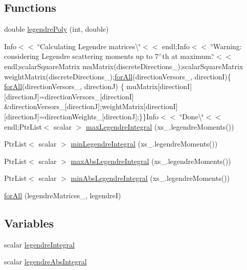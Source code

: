 \subsection*{Functions}
\begin{DoxyCompactItemize}
\item 
double \hyperlink{calcLegendreMatrices_8H_ad27427e4bcb16b18937b0bf2ca436296}{legendre\+Poly} (int, double)
\item 
Info$<$$<$ \char`\"{}Calculating Legendre matrices\textbackslash{}\char`\"{}$<$$<$ endl;Info$<$$<$ \char`\"{}Warning\+: considering Legendre scattering moments up to 7$^\wedge$th at maximum.\char`\"{}$<$$<$ endl;scalar\+Square\+Matrix mu\+Matrix(discrete\+Directions\+\_\+);scalar\+Square\+Matrix weight\+Matrix(discrete\+Directions\+\_\+);\hyperlink{correctBoundaryFlux__2p_8H_a72582193b0ba782b35945b2502401afd}{for\+All}(direction\+Versors\+\_\+, directionI)\{ \hyperlink{correctBoundaryFlux__2p_8H_a72582193b0ba782b35945b2502401afd}{for\+All}(direction\+Versors\+\_\+, directionJ) \{ mu\+Matrix\mbox{[}directionI\mbox{]}\mbox{[}directionJ\mbox{]}=direction\+Versors\+\_\+\mbox{[}directionI\mbox{]} \&direction\+Versors\+\_\+\mbox{[}directionJ\mbox{]};weight\+Matrix\mbox{[}directionI\mbox{]}\mbox{[}directionJ\mbox{]}=direction\+Weights\+\_\+\mbox{[}directionJ\mbox{]};\}\}Info$<$$<$ \char`\"{}Done\textbackslash{}\char`\"{}$<$$<$ endl;Ptr\+List$<$ scalar $>$ \hyperlink{calcLegendreMatrices_8H_aca7173d47ee3def5f50a4e2693fc5b31}{max\+Legendre\+Integral} (xs\+\_\+.\+legendre\+Moments())
\item 
Ptr\+List$<$ scalar $>$ \hyperlink{calcLegendreMatrices_8H_a379818ae2c8b40656a8c3b42d9b195e1}{min\+Legendre\+Integral} (xs\+\_\+.\+legendre\+Moments())
\item 
Ptr\+List$<$ scalar $>$ \hyperlink{calcLegendreMatrices_8H_a432a4386152ea9f997acf3b7b75304a9}{max\+Abs\+Legendre\+Integral} (xs\+\_\+.\+legendre\+Moments())
\item 
Ptr\+List$<$ scalar $>$ \hyperlink{calcLegendreMatrices_8H_aca3b860bf76e38dcf8c33d0727d948e9}{min\+Abs\+Legendre\+Integral} (xs\+\_\+.\+legendre\+Moments())
\item 
\hyperlink{calcLegendreMatrices_8H_a76fa282db59e7ee5d1bfca6d063fbabb}{for\+All} (legendre\+Matrices\+\_\+, legendreI)
\end{DoxyCompactItemize}
\subsection*{Variables}
\begin{DoxyCompactItemize}
\item 
scalar \hyperlink{calcLegendreMatrices_8H_ac0b8de0e03838e5955c68b6bbd8b813d}{legendre\+Integral}
\item 
scalar \hyperlink{calcLegendreMatrices_8H_a5e15e45be3e658edaaf221dcddb6d766}{legendre\+Abs\+Integral}
\end{DoxyCompactItemize}


